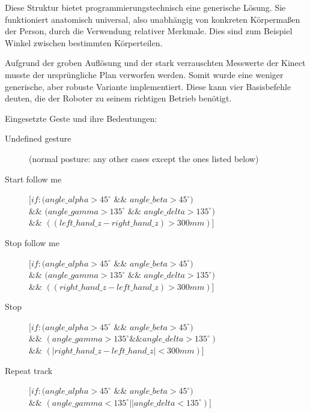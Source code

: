 Diese Struktur bietet programmierungstechnisch eine generische Lösung. Sie funktioniert anatomisch universal,
 also unabhängig von konkreten Körpermaßen der Person, durch die Verwendung relativer Merkmale.
 Dies sind zum Beispiel Winkel zwischen bestimmten Körperteilen.
 
Aufgrund der groben Auflösung und der stark verrauschten Messwerte der Kinect musste der ursprüngliche Plan verworfen werden.
 Somit wurde eine weniger generische, aber robuste Variante implementiert. Diese kann vier Basisbefehle deuten, die der Roboter zu seinem richtigen Betrieb benötigt.
\vspace{0.3cm}

\noindent Eingesetzte Geste und ihre Bedeutungen:
\begin{description}
  \item[Undefined gesture] (normal posture: any other cases except the ones
  listed below)
  \item[Start follow me] 
  $[if: (angle\_alpha > 45^\circ$ $\&\&$ $angle\_beta >
  45^\circ)$\\
  $\&\&$ $(angle\_gamma > 135^\circ$ $\&\&$ $angle\_delta >
  135^\circ)$\\
  $\&\&$ $((left\_hand\_z - right\_hand\_z) > 300 mm)]$
  \item[Stop follow me] $[if: (angle\_alpha > 45^\circ$ $\&\&$ $angle\_beta >
  45^\circ)$\\
  $\&\&$ $(angle\_gamma > 135^\circ$ $\&\&$ $angle\_delta > 135^\circ)$\\
  $\&\&$ $((right\_hand\_z - left\_hand\_z) > 300 mm)]$
  \item[Stop] $[if: (angle\_alpha > 45^\circ$ $\&\&$ $angle\_beta > 45^\circ)$\\
  $\&\&$ $(angle\_gamma > 135^\circ \&\& angle\_delta > 135^\circ)$\\
  $\&\&$ $(|right\_hand\_z - left\_hand\_z| < 300 mm)]$
  \item[Repeat track] $[if: (angle\_alpha > 45^\circ$ $\&\&$ $angle\_beta >
  45^\circ)$\\
  $\&\&$ $(angle\_gamma < 135^\circ || angle\_delta < 135^\circ)]$
\end{description}

